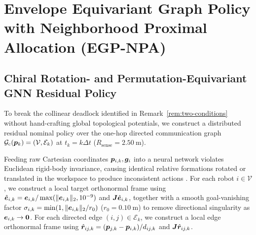 \section{Envelope Equivariant Graph Policy with Neighborhood Proximal Allocation (EGP-NPA)}\label{sec:method}

\subsection{Chiral Rotation- and Permutation-Equivariant GNN Residual Policy}\label{subsec:gnn-arch}
To break the collinear deadlock identified in Remark~\ref{rem:two-conditions} without hand-crafting global topological potentials, we construct a distributed residual nominal policy over the one-hop directed communication graph $\mathcal G_{\mathrm c}(\boldsymbol{p}_k)=(\mathcal V,\mathcal E_k)$ at $t_k=k\Delta t$ ($R_{\mathrm{sense}}=2.50\ \mathrm m$).

Feeding raw Cartesian coordinates $\boldsymbol{p}_{i,k},\boldsymbol{g}_i$ into a neural network violates Euclidean rigid-body invariance, causing identical relative formations rotated or translated in the workspace to produce inconsistent actions \cite{satorras2021egnn}. For each robot $i\in\mathcal V$, we construct a local target orthonormal frame using $\hat{\boldsymbol{e}}_{i,k}=\boldsymbol{e}_{i,k}/\max(\lVert\boldsymbol{e}_{i,k}\rVert_2,10^{-9})$ and $\boldsymbol{J}\hat{\boldsymbol{e}}_{i,k}$, together with a smooth goal-vanishing factor $\sigma_{i,k}=\min(1,\lVert\boldsymbol{e}_{i,k}\rVert_2/r_0)$ ($r_0=0.10\ \mathrm m$) to remove directional singularity as $\boldsymbol{e}_{i,k}\to\boldsymbol 0$. For each directed edge $(i,j)\in\mathcal E_k$, we construct a local edge orthonormal frame using $\hat{\boldsymbol{r}}_{ij,k}=(\boldsymbol{p}_{j,k}-\boldsymbol{p}_{i,k})/d_{ij,k}$ and $\boldsymbol{J}\hat{\boldsymbol{r}}_{ij,k}$.

